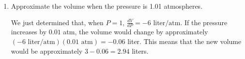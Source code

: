 \documentclass{article}
\begin{document}
\begin{enumerate}
\begin{enumerate}


  \item
    \begin{problem}[\vfill]
     Approximate the volume when the pressure is 1.01 atmospheres.
    \end{problem}

    \begin{solution}
    We just determined that, when $P=1$, $\frac{dV}{dP}=-6\text{ liter/atm}$. If the pressure increases by $0.01$ atm, the volume would change by approximately $(-6\text{ liter/atm})(0.01\text{ atm})=-0.06$ liter. This means that the new volume would be approximately $3-0.06=2.94$ liters.

    \end{solution}

  \end{enumerate}


\end{enumerate}
\end{document}
